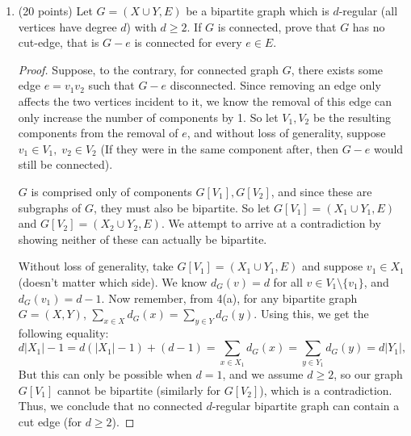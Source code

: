 \documentclass[11pt]{article}
\newcommand{\n}{\vspace{0.3cm}}
\begin{document}
\begin{enumerate}
\begin{enumerate}
      \end{enumerate}

    \item (20 points) Let \(G = (X \cup Y, E)\) be a bipartite graph which is \(d\)-regular (all vertices have degree \(d\)) with \(d \geq 2\).  If \(G\) is connected, prove that \(G\) has no cut-edge, that is \(G - e\) is connected for every \(e \in E\).
      \begin{proof}
        Suppose, to the contrary, for connected graph \(G\), there exists some edge \(e = v_1v_2\) such that \(G - e\) disconnected.  Since removing an edge only affects the two vertices incident to it, we know the removal of this edge can only increase the number of components by 1.  So let \(V_1, V_2\) be the resulting components from the removal of \(e\), and without loss of generality, suppose \(v_1 \in V_1, \; v_2 \in V_2\) (If they were in the same component after, then \(G-e\) would still be connected). \n

        \(G\) is comprised only of components \(G[V_1], G[V_2]\), and since these are subgraphs of \(G\), they must also be bipartite.  So let \(G[V_1] = (X_1 \cup Y_1, E)\) and \(G[V_2] = (X_2 \cup Y_2, E)\).  We attempt to arrive at a contradiction by showing neither of these can actually be bipartite. \n

        Without loss of generality, take \(G[V_1] = (X_1 \cup Y_1, E)\) and suppose \(v_1 \in X_1\) (doesn't matter which side).  We know \(d_G(v) = d\) for all \(v \in V_1 \setminus \{v_1\}\), and \(d_G(v_1) = d-1\).  Now remember, from 4(a), for any bipartite graph \(G = (X,Y)\), \(\sum_{x \in X} d_G(x) = \sum_{y \in Y} d_G(y)\).  Using this, we get the following equality:
        \[d|X_1| - 1 = d(|X_1| - 1) + (d - 1) = \sum_{x \in X_1} d_G(x) = \sum_{y \in Y_1} d_G(y) = d|Y_1|,\]
        But this can only be possible when \(d = 1\), and we assume \(d \geq 2\), so our graph \(G[V_1]\) cannot be bipartite (similarly for \(G[V_2]\)), which is a contradiction.  Thus, we conclude that no connected \(d\)-regular bipartite graph can contain a cut edge (for \(d \geq 2\)).
      \end{proof}
      
  \end{enumerate}
\end{document}
